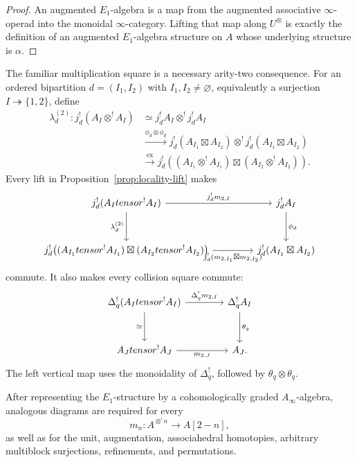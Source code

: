 \documentclass[11pt,reqno]{amsart}
\theoremstyle{definition}
\theoremstyle{remark}
\begin{document}
\begin{proof}
An augmented \(E_1\)-algebra is a map from the augmented associative
\(\infty\)-operad into the monoidal \(\infty\)-category.  Lifting that
map along \(U^\otimes\) is exactly the definition of an augmented
\(E_1\)-algebra structure on \(A\) whose underlying structure is
\(\alpha\).
\end{proof}

The familiar multiplication square is a necessary arity-two
consequence.  For an ordered bipartition \(d=(I_1,I_2)\) with
\(I_1,I_2\ne\varnothing\), equivalently a surjection
\(I\twoheadrightarrow\{1,2\}\), define
\[
\begin{aligned}
 \lambda_d^{(2)}:
 j_d^!(A_I\otimes^!A_I)
 &\simeq j_d^!A_I\otimes^!j_d^!A_I\\
 &\xrightarrow{\phi_d\otimes\phi_d}
 j_d^!(A_{I_1}\boxtimes A_{I_2})
 \otimes^!
 j_d^!(A_{I_1}\boxtimes A_{I_2})\\
 &\xrightarrow{\mathrm{ex}}
 j_d^!\!\left(
 (A_{I_1}\otimes^!A_{I_1})\boxtimes
 (A_{I_2}\otimes^!A_{I_2})\right).
\end{aligned}
\]
Every lift in Proposition~\ref{prop:locality-lift} makes
\[
\begin{tikzcd}[column sep=4.2em,row sep=3em]
 j_d^!(A_I\otimes^!A_I)
   \arrow[r,"j_d^!m_{2,I}"]
   \arrow[d,"\lambda_d^{(2)}"']
 &
 j_d^!A_I
   \arrow[d,"\phi_d"]
 \\
 j_d^!\!\left(
 (A_{I_1}\otimes^!A_{I_1})\boxtimes
 (A_{I_2}\otimes^!A_{I_2})\right)
   \arrow[r,"j_d^!(m_{2,I_1}\boxtimes m_{2,I_2})"']
 &
 j_d^!(A_{I_1}\boxtimes A_{I_2})
\end{tikzcd}
\]
commute.  It also makes every collision square commute:
\[
\begin{tikzcd}[column sep=4em,row sep=3em]
 \Delta_q^!(A_I\otimes^!A_I)
   \arrow[r,"\Delta_q^!m_{2,I}"]
   \arrow[d,"\simeq"']
 &
 \Delta_q^!A_I
   \arrow[d,"\theta_q"]
 \\
 A_J\otimes^!A_J
   \arrow[r,"m_{2,J}"']
 &
 A_J .
\end{tikzcd}
\]
The left vertical map uses the monoidality of \(\Delta_q^!\), followed
by \(\theta_q\otimes\theta_q\).

After representing the \(E_1\)-structure by a cohomologically graded
\(A_\infty\)-algebra, analogous diagrams are required for every
\[
 m_n:A^{\otimes^!n}\longrightarrow A[2-n],
\]
as well as for the unit, augmentation, associahedral homotopies,
arbitrary multiblock surjections, refinements, and permutations.
\end{document}
